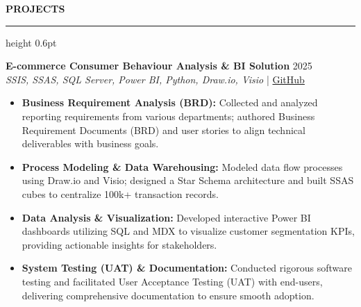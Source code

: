 ﻿\documentclass{resume}
\renewcommand{\sectionskip}{\vspace{5pt}}
\renewcommand{\sectionlineskip}{\vspace{3pt}}
\renewenvironment{rSection}[1]{
  \sectionskip
  {\color{headerblue}\textbf{\MakeUppercase{#1}}}
  \sectionlineskip
  {\color{rulegray}\hrule height 0.6pt}
  \vspace{0pt}
  \begin{list}{}{
    \setlength{\leftmargin}{0em}
    \setlength{\topsep}{0pt}
    \setlength{\partopsep}{0pt}
    \setlength{\parsep}{0pt}
    \setlength{\itemsep}{0pt}
  }
  \item[]
}{
  \end{list}
}
\begin{document}
\begin{rSection}{Projects}
    \item \textbf{E-commerce Consumer Behaviour Analysis \& BI Solution} \hfill 2025\\
    {\small \textit{SSIS, SSAS, SQL Server, Power BI, Python, Draw.io, Visio}} \hfill | \href{https://github.com/vietpham10205/Datawarehouse-Olap_Project-E-commerce-Consumer-Behavior-Analysis-BI-Solution}{GitHub}
    {\small
    \begin{itemize}[itemsep=4pt, parsep=0pt, leftmargin=1.2em]
        \item \textbf{Business Requirement Analysis (BRD):} Collected and analyzed reporting requirements from various departments; authored Business Requirement Documents (BRD) and user stories to align technical deliverables with business goals.
        \item \textbf{Process Modeling \& Data Warehousing:} Modeled data flow processes using Draw.io and Visio; designed a Star Schema architecture and built SSAS cubes to centralize 100k+ transaction records.
        \item \textbf{Data Analysis \& Visualization:} Developed interactive Power BI dashboards utilizing SQL and MDX to visualize customer segmentation KPIs, providing actionable insights for stakeholders.
        \item \textbf{System Testing (UAT) \& Documentation:} Conducted rigorous software testing and facilitated User Acceptance Testing (UAT) with end-users, delivering comprehensive documentation to ensure smooth adoption.
    \end{itemize}
    }
    \vspace{15pt}


\end{rSection}
\end{document}
